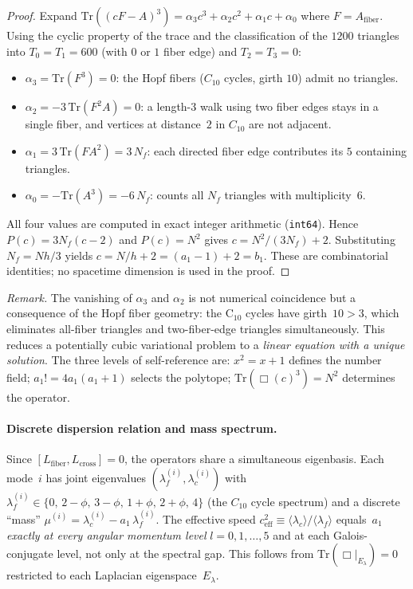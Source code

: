 \documentclass[12pt,a4paper]{article}
\theoremstyle{definition}
\begin{document}
\begin{proof}
Expand $\mathrm{Tr}((cF - A)^3) = \alpha_3 c^3 + \alpha_2 c^2 + \alpha_1 c + \alpha_0$ where $F = A_{\mathrm{fiber}}$.  Using the cyclic property of the trace and the classification of the $1200$ triangles into $T_0 = T_1 = 600$ (with $0$ or $1$ fiber edge) and $T_2 = T_3 = 0$:
\begin{itemize}
\item $\alpha_3 = \mathrm{Tr}(F^3) = 0$: the Hopf fibers ($C_{10}$ cycles, girth $10$) admit no triangles.
\item $\alpha_2 = -3\,\mathrm{Tr}(F^2 A) = 0$: a length-$3$ walk using two fiber edges stays in a single fiber, and vertices at distance~$2$ in $C_{10}$ are not adjacent.
\item $\alpha_1 = 3\,\mathrm{Tr}(F A^2) = 3\,N_f$: each directed fiber edge contributes its $5$ containing triangles.
\item $\alpha_0 = -\mathrm{Tr}(A^3) = -6\,N_f$: counts all $N_f$ triangles with multiplicity~$6$.
\end{itemize}
All four values are computed in exact integer arithmetic (\texttt{int64}).  Hence $P(c) = 3N_f(c-2)$ and $P(c) = N^2$ gives $c = N^2/(3N_f) + 2$.  Substituting $N_f = N h/3$ yields $c = N/h + 2 = (a_1 - 1) + 2 = b_1$.  These are combinatorial identities; no spacetime dimension is used in the proof.
\end{proof}

\noindent\textit{Remark.}  The vanishing of $\alpha_3$ and $\alpha_2$ is not numerical coincidence but a consequence of the Hopf fiber geometry: the C$_{10}$ cycles have girth~$10 > 3$, which eliminates all-fiber triangles and two-fiber-edge triangles simultaneously.  This reduces a potentially cubic variational problem to a \emph{linear equation with a unique solution}.  The three levels of self-reference are: $x^2 = x + 1$ defines the number field; $a_1! = 4a_1(a_1\!+\!1)$ selects the polytope; $\mathrm{Tr}(\Box(c)^3) = N^2$ determines the operator.

\paragraph{Discrete dispersion relation and mass spectrum.}
Since $[L_{\mathrm{fiber}}, L_{\mathrm{cross}}] = 0$, the operators share a simultaneous eigenbasis. Each mode~$i$ has joint eigenvalues $(\lambda_f^{(i)}, \lambda_c^{(i)})$ with $\lambda_f^{(i)} \in \{0,\, 2\!-\!\phi,\, 3\!-\!\phi,\, 1\!+\!\phi,\, 2\!+\!\phi,\, 4\}$ (the $C_{10}$ cycle spectrum) and a discrete ``mass'' $\mu^{(i)} = \lambda_c^{(i)} - a_1\,\lambda_f^{(i)}$.  The effective speed $c_{\mathrm{eff}}^2 \equiv \langle\lambda_c\rangle/\langle\lambda_f\rangle$ equals~$a_1$ \emph{exactly at every angular momentum level} $l = 0, 1, \ldots, 5$ and at each Galois-conjugate level, not only at the spectral gap.  This follows from $\mathrm{Tr}(\Box|_{E_\lambda}) = 0$ restricted to each Laplacian eigenspace~$E_\lambda$.
\end{document}

